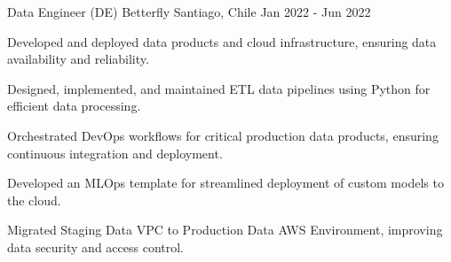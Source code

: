 \cventry
{Data Engineer (DE)}
{Betterfly}
{Santiago, Chile}
{Jan 2022 - Jun 2022}
{
\begin{cvitems}
    \item Developed and deployed data products and cloud infrastructure, ensuring data availability and reliability.
    \item Designed, implemented, and maintained ETL data pipelines using Python for efficient data processing.
    \item Orchestrated DevOps workflows for critical production data products, ensuring continuous integration and deployment.
    \item Developed an MLOps template for streamlined deployment of custom models to the cloud.
    \item Migrated Staging Data VPC to Production Data AWS Environment, improving data security and access control.
\end{cvitems}
}
